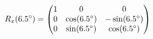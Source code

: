 \documentclass[preview]{standalone}
\begin{document}
\begin{align*}
\special{dvisvgm:raw <g id='unique000'>}R_x(6.5^\circ) = \begin{pmatrix} 1 & 0 & 0 \\ 0 & \cos(6.5^\circ) & -\sin(6.5^\circ) \\ 0 & \sin(6.5^\circ) & \cos(6.5^\circ) \end{pmatrix}\special{dvisvgm:raw </g>}
\end{align*}
\end{document}
